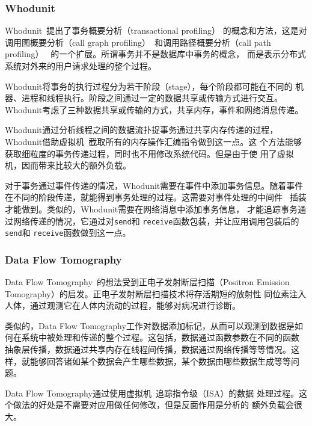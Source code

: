 \subsubsection*{Whodunit}

Whodunit~\cite{whodunit}提出了事务概要分析（transactional profiling）
的概念和方法，这是对调用图概要分析（call graph
profiling）~\cite{Graham2004}和调用路径概要分析（call path profiling）~
\cite{Hall1992, Hall1993}的一个扩展。所谓事务并不是数据库中事务的概念，
而是表示分布式系统对外来的用户请求处理的整个过程。

Whodunit将事务的执行过程分为若干阶段（stage），每个阶段都可能在不同的
机器、进程和线程执行。阶段之间通过一定的数据共享或传输方式进行交互。
Whodunit考虑了三种数据共享或传输的方式，共享内存，事件和网络消息传递。

Whodunit通过分析线程之间的数据流扑捉事务通过共享内存传递的过程，
Whodunit借助虚拟机~\cite{qemu}截取所有的内存操作汇编指令做到这一点。这
个方法能够获取细粒度的事务传递过程，同时也不用修改系统代码。但是由于使
用了虚拟机，因而带来比较大的额外负载。

对于事务通过事件传递的情况，Whodunit需要在事件中添加事务信息。随着事件
在不同的阶段传递，就能得到事务处理的过程。这需要对事件处理的中间件
~\cite{seda}插装才能做到。类似的，Whodunit需要在网络消息中添加事务信息，
才能追踪事务通过网络传递的情况，它通过对\texttt{send}和
\texttt{receive}函数包装，并让应用调用包装后的\texttt{send}和
\texttt{receive}函数做到这一点。

\subsubsection*{Data Flow Tomography}

Data Flow Tomography~\cite{dft}的想法受到正电子发射断层扫描（Positron
Emission Tomography）的启发。正电子发射断层扫描技术将存活期短的放射性
同位素注入人体，通过观测它在人体内流动的过程，能够对病况进行诊断。

类似的，Data Flow Tomography工作对数据添加标记，从而可以观测到数据是如
何在系统中被处理和传递的整个过程。这包括，数据通过函数参数在不同的函数
抽象层传播，数据通过共享内存在线程间传播，数据通过网络传播等等情况。这
样，就能够回答诸如某个数据会产生哪些数据，某个数据由哪些数据生成等等问
题。

Data Flow Tomography通过使用虚拟机~\cite{qemu}追踪指令级（ISA）的数据
处理过程。这个做法的好处是不需要对应用做任何修改，但是反面作用是分析的
额外负载会很大。



